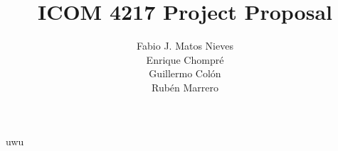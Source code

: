 \documentclass[12pt]{report}
\title{ICOM 4217 Project Proposal}
\author{Fabio J. Matos Nieves\\
  Enrique Chompré\\
  Guillermo Colón\\
Rubén Marrero\\}
\begin{document}
\linespread{1.0}

\linespread{2.0}
uwu
\cite{bahendekaEADSGGuidelinesInsulin2019}


\end{document}
